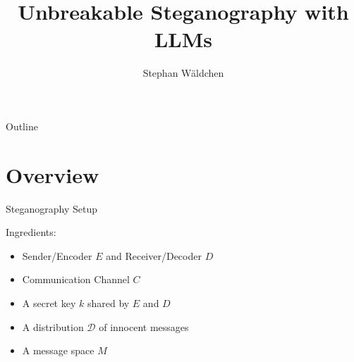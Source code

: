 \documentclass[8pt]{beamer}
\title[Steganography with LLMs]{Unbreakable Steganography with LLMs}
\author{Stephan Wäldchen}
\institute{Iliad Intensive June 2026}
\begin{document}
\begin{frame}
    \titlepage
\end{frame}

\begin{frame}{Outline}
    \tableofcontents
\end{frame}

\section{Overview}

\begin{frame}{Steganography Setup}


Ingredients:
    \begin{itemize}
        \item Sender/Encoder $E$ and Receiver/Decoder $D$
        \item Communication Channel $C$
        \item A secret key $k$ shared by $E$ and $D$
        \item A distribution $\mathcal{D}$ of innocent messages
        \item A message space $M$
    \end{itemize}
    
\end{frame}
\end{document}
